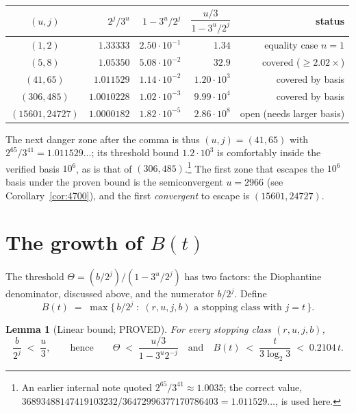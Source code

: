 \documentclass[10pt]{article}
\newtheorem{lemma}[theorem]{Lemma}
\theoremstyle{definition}
\theoremstyle{remark}
\newcommand{\lb}{\log_2 3}
\begin{document}
\begin{center}
\begin{tabular}{crrrr}
\hline
$(u,j)$ & $2^{j}/3^{u}$ & $1 - 3^{u}/2^{j}$ & $\dfrac{u/3}{1-3^{u}/2^{j}}$ &
status \\
\hline
$(1,2)$        & $1.33333$   & $2.50\cdot 10^{-1}$ & $1.34$ &
 equality case $n=1$ \\
$(5,8)$        & $1.05350$   & $5.08\cdot 10^{-2}$ & $32.9$ &
 covered ($\ge 2.02\times$) \\
$(41,65)$      & $1.011529$  & $1.14\cdot 10^{-2}$ & $1.20\cdot 10^{3}$ &
 covered by basis \\
$(306,485)$    & $1.0010228$ & $1.02\cdot 10^{-3}$ & $9.99\cdot 10^{4}$ &
 covered by basis \\
$(15601,24727)$& $1.0000182$ & $1.82\cdot 10^{-5}$ & $2.86\cdot 10^{8}$ &
 open (needs larger basis) \\
\hline
\end{tabular}
\end{center}

The next danger zone after the comma is thus $(u,j) = (41,65)$ with
$2^{65}/3^{41} = 1.011529\ldots$; its threshold bound $1.2\cdot 10^{3}$ is
comfortably inside the verified basis $10^{6}$, as is that of
$(306,485)$.\footnote{An earlier internal note quoted $2^{65}/3^{41} \approx
1.0035$; the correct value, $36893488147419103232 / 36472996377170786403 =
1.011529\ldots$, is used here.} The first zone that escapes the $10^{6}$
basis under the proven bound is the semiconvergent $u = 2966$ (see
Corollary~\ref{cor:4700}), and the first \emph{convergent} to escape is
$(15601, 24727)$.

\section{The growth of $B(t)$}\label{sec:bgrowth}

The threshold $\Theta = (b/2^{j})/(1 - 3^{u}/2^{j})$ has two factors: the
Diophantine denominator, discussed above, and the numerator $b/2^{j}$. Define
\[
B(t) \;=\; \max\{\, b/2^{j} \;:\; (r,u,j,b) \text{ a stopping class with }
j = t \,\}.
\]

\begin{lemma}[Linear bound; PROVED]\label{lem:bbound}
For every stopping class $(r,u,j,b)$,
\[
\frac{b}{2^{j}} \;<\; \frac{u}{3},
\qquad\text{hence}\qquad
\Theta \;<\; \frac{u/3}{1 - 3^{u}2^{-j}}
\quad\text{and}\quad
B(t) \;<\; \frac{t}{3\lb} \;<\; 0.2104\, t .
\]
\end{lemma}
\end{document}
